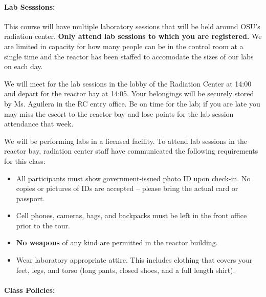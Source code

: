 \documentclass[11pt, a4paper]{article}
\begin{document}
\paragraph{Lab Sesssions:}

This course will have multiple laboratory sessions that will be held
around OSU's radiation center. \textbf{Only attend lab sessions to which you are registered.} We are limited in capacity for how many people can be in the control room at a single time and the reactor has been staffed to accomodate the sizes of our labs on each day. 

We will meet for the lab sessions in the lobby of the Radiation Center at 14:00 and depart for the reactor bay at 14:05. Your belongings will be securely stored by Ms. Aguilera in the RC entry office. Be on time for the lab; if you are late you may miss the escort to the reactor bay and lose points for the lab session attendance that week. 

We will be performing labs in a licensed facility. To attend lab sessions in the reactor bay, radiation center staff have communicated the following requirements for this class:

\begin{itemize}
\item All participants must show government-issued photo ID upon check-in. No copies or pictures of IDs are accepted -- please bring the actual card or passport. 
\item Cell phones, cameras, bags, and backpacks must be left in the front office prior to the tour. 
\item \textbf{No weapons} of any kind are permitted in the reactor building. 
\item Wear laboratory appropriate attire. This includes clothing that covers your feet, legs, and torso (long pants, closed shoes, and a full length shirt). 
\end{itemize} 


\paragraph{Class Policies:}
\end{document}
